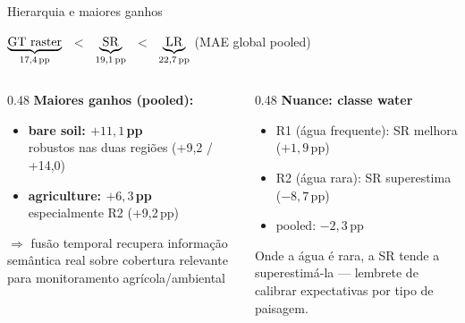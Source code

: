 \documentclass[aspectratio=169]{beamer}
\begin{document}
\begin{frame}{Hierarquia e maiores ganhos}

  \begin{center}
    \Large
    $\underbrace{\text{GT raster}}_{\text{17,4\,pp}}$
    $\;<\;$
    $\underbrace{\text{SR}}_{\text{19,1\,pp}}$
    $\;<\;$
    $\underbrace{\text{LR}}_{\text{22,7\,pp}}$
    \normalsize\quad (MAE global pooled)
  \end{center}

  \vspace{0.4em}
  \begin{columns}[T]
    \begin{column}{0.48\textwidth}
      \textbf{Maiores ganhos (pooled):}
      \begin{itemize}
        \item \textcolor{gain}{\textbf{bare soil: $+11{,}1$\,pp}}\\
              robustos nas duas regiões (+9,2 / +14,0)
        \item \textcolor{gain}{\textbf{agriculture: $+6{,}3$\,pp}}\\
              especialmente R2 (+9,2\,pp)
      \end{itemize}
      $\Rightarrow$ fusão temporal recupera informação semântica real sobre cobertura relevante para monitoramento agrícola/ambiental
    \end{column}
    \begin{column}{0.48\textwidth}
      \textbf{Nuance: classe water}
      \begin{itemize}
        \item R1 (água frequente): SR melhora ($+1{,}9$\,pp)
        \item R2 (água rara): SR superestima ($-8{,}7$\,pp)
        \item pooled: $-2{,}3$\,pp
      \end{itemize}
      \vspace{0.2em}
      Onde a água é rara, a SR tende a superestimá-la --- lembrete de
      calibrar expectativas por tipo de paisagem.
    \end{column}
  \end{columns}

\end{frame}
\end{document}
